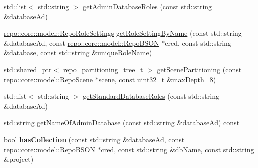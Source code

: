 \begin{DoxyCompactItemize}
\item 
std\+::list$<$ std\+::string $>$ \hyperlink{classrepo_1_1manipulator_1_1_repo_manipulator_a4c559d09f639d420f929c5f0fec074b5}{get\+Admin\+Database\+Roles} (const std\+::string \&database\+Ad)
\item 
\hyperlink{classrepo_1_1core_1_1model_1_1_repo_role_settings}{repo\+::core\+::model\+::\+Repo\+Role\+Settings} \hyperlink{classrepo_1_1manipulator_1_1_repo_manipulator_a432a4e4e724d4f1dcb2c864b799c8f78}{get\+Role\+Setting\+By\+Name} (const std\+::string \&database\+Ad, const \hyperlink{classrepo_1_1core_1_1model_1_1_repo_b_s_o_n}{repo\+::core\+::model\+::\+Repo\+B\+S\+O\+N} $\ast$cred, const std\+::string \&database, const std\+::string \&unique\+Role\+Name)
\item 
std\+::shared\+\_\+ptr$<$ \hyperlink{structrepo__partitioning__tree__t}{repo\+\_\+partitioning\+\_\+tree\+\_\+t} $>$ \hyperlink{classrepo_1_1manipulator_1_1_repo_manipulator_ab1e8a704d99997793cce72d1d6f371e3}{get\+Scene\+Partitioning} (const \hyperlink{classrepo_1_1core_1_1model_1_1_repo_scene}{repo\+::core\+::model\+::\+Repo\+Scene} $\ast$scene, const uint32\+\_\+t \&max\+Depth=8)
\item 
std\+::list$<$ std\+::string $>$ \hyperlink{classrepo_1_1manipulator_1_1_repo_manipulator_a2e221e47db368a794187a134678aa83e}{get\+Standard\+Database\+Roles} (const std\+::string \&database\+Ad)
\item 
std\+::string \hyperlink{classrepo_1_1manipulator_1_1_repo_manipulator_a9ad9ece3b9a29293f5c40682a2d3fcd3}{get\+Name\+Of\+Admin\+Database} (const std\+::string \&database\+Ad) const 
\item 
\hypertarget{classrepo_1_1manipulator_1_1_repo_manipulator_af2a2e0162850ce339b950b0e3b6f3420}{}bool {\bfseries has\+Collection} (const std\+::string \&database\+Ad, const \hyperlink{classrepo_1_1core_1_1model_1_1_repo_b_s_o_n}{repo\+::core\+::model\+::\+Repo\+B\+S\+O\+N} $\ast$cred, const std\+::string \&db\+Name, const std\+::string \&project)\label{classrepo_1_1manipulator_1_1_repo_manipulator_af2a2e0162850ce339b950b0e3b6f3420}


\end{DoxyCompactItemize}
